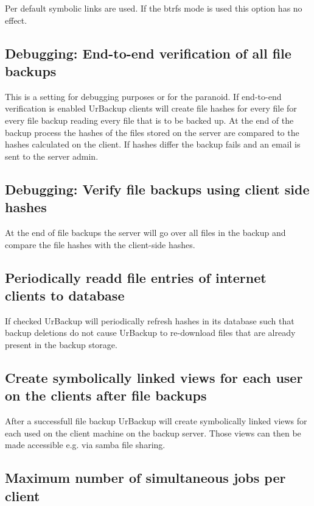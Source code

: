 \documentclass[a4paper,10pt]{article}
\begin{document}
Per default symbolic links are used. If the btrfs mode is used this option has no effect.

\subsection{Debugging: End-to-end verification of all file backups}

This is a setting for debugging purposes or for the paranoid. If end-to-end verification is enabled UrBackup clients
will create file hashes for every file for every file backup reading every file that is to be backed up. At the end
of the backup process the hashes of the files stored on the server are compared to the hashes calculated on the client.
If hashes differ the backup fails and an email is sent to the server admin.

\subsection{Debugging: Verify file backups using client side hashes}

At the end of file backups the server will go over all files in the backup and compare the file hashes with the
client-side hashes.

\subsection{Periodically readd file entries of internet clients to database}

If checked UrBackup will periodically refresh hashes in its database such that backup deletions do not cause UrBackup to re-download files that are already present in the backup storage.

\subsection{Create symbolically linked views for each user on the clients after file backups}

After a successfull file backup UrBackup will create symbolically linked views for each used on the client machine on the backup server.
Those views can then be made accessible e.g. via samba file sharing.

\subsection{Maximum number of simultaneous jobs per client}
\end{document}
